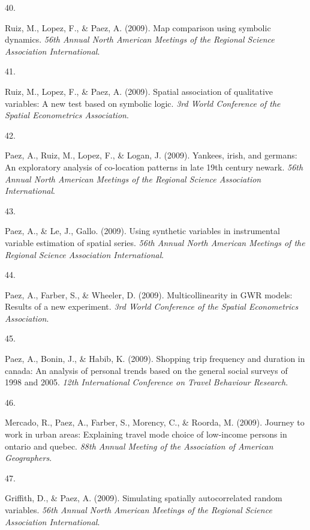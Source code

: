 \documentclass[10pt,a4paper,]{twentysecondcv}
\newlength{\csllabelwidth}
\newcommand{\CSLLeftMargin}[1]{\parbox[t]{\csllabelwidth}{#1}}
\newcommand{\CSLRightInline}[1]{\parbox[t]{\linewidth - \csllabelwidth}{#1}}
\begin{document}
\leavevmode{}%
\CSLLeftMargin{40. }%
\CSLRightInline{Ruiz, M., Lopez, F., \& Paez, A. (2009). Map comparison
using symbolic dynamics. \emph{56th Annual North American Meetings of
the Regional Science Association International}.}

\leavevmode{}%
\CSLLeftMargin{41. }%
\CSLRightInline{Ruiz, M., Lopez, F., \& Paez, A. (2009). Spatial
association of qualitative variables: A new test based on symbolic
logic. \emph{3rd World Conference of the Spatial Econometrics
Association}.}

\leavevmode{}%
\CSLLeftMargin{42. }%
\CSLRightInline{Paez, A., Ruiz, M., Lopez, F., \& Logan, J. (2009).
Yankees, irish, and germans: An exploratory analysis of co-location
patterns in late 19th century newark. \emph{56th Annual North American
Meetings of the Regional Science Association International}.}

\leavevmode{}%
\CSLLeftMargin{43. }%
\CSLRightInline{Paez, A., \& Le, J., Gallo. (2009). Using synthetic
variables in instrumental variable estimation of spatial series.
\emph{56th Annual North American Meetings of the Regional Science
Association International}.}

\leavevmode{}%
\CSLLeftMargin{44. }%
\CSLRightInline{Paez, A., Farber, S., \& Wheeler, D. (2009).
Multicollinearity in GWR models: Results of a new experiment. \emph{3rd
World Conference of the Spatial Econometrics Association}.}

\leavevmode{}%
\CSLLeftMargin{45. }%
\CSLRightInline{Paez, A., Bonin, J., \& Habib, K. (2009). Shopping trip
frequency and duration in canada: An analysis of personal trends based
on the general social surveys of 1998 and 2005. \emph{12th International
Conference on Travel Behaviour Research}.}

\leavevmode{}%
\CSLLeftMargin{46. }%
\CSLRightInline{Mercado, R., Paez, A., Farber, S., Morency, C., \&
Roorda, M. (2009). Journey to work in urban areas: Explaining travel
mode choice of low-income persons in ontario and quebec. \emph{88th
Annual Meeting of the Association of American Geographers}.}

\leavevmode{}%
\CSLLeftMargin{47. }%
\CSLRightInline{Griffith, D., \& Paez, A. (2009). Simulating spatially
autocorrelated random variables. \emph{56th Annual North American
Meetings of the Regional Science Association International}.}
\end{document}
